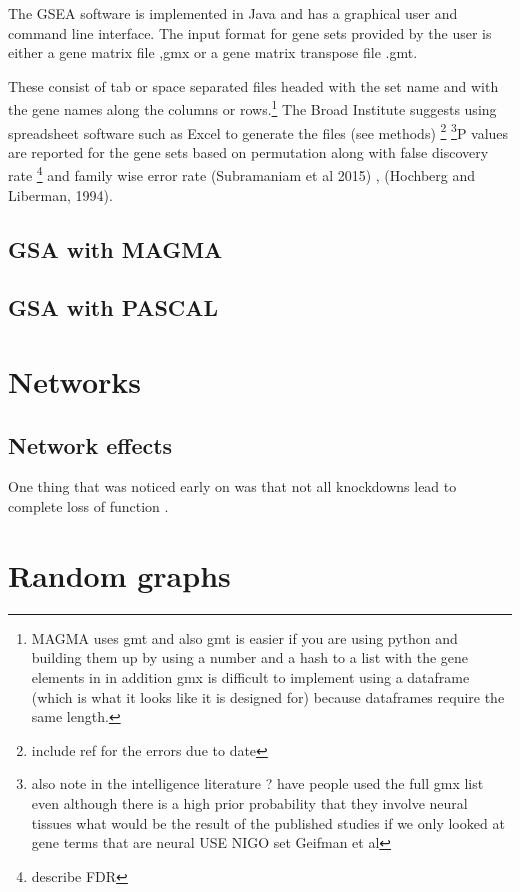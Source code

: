 The GSEA software is implemented in Java and has a graphical user and command line interface. The input format for gene sets provided by the user is either a gene matrix file ,gmx or a gene matrix transpose file .gmt.

These consist of tab or space separated files headed with the set name and with the gene names along the columns or rows.\footnote{MAGMA uses gmt and also gmt is easier if you are using python and building them up by using a number and a hash to a list with the gene elements in in addition gmx is difficult to implement using a dataframe (which is what it looks like it is designed for) because dataframes require the same length.} The Broad Institute suggests using spreadsheet software such as Excel to generate the files (see methods) \footnote{include ref for the errors due to date} \footnote{also note in the intelligence literature ? have people used the full gmx list even although there is a high prior probability that they involve neural tissues what would be the result of the published studies if we only looked at gene terms that are neural USE NIGO set   Geifman et al}P values are reported for the gene sets based on permutation along with false discovery rate \cite{benjamini1995controlling}\footnote{describe FDR} and family wise error rate (Subramaniam et al 2015) , (Hochberg and Liberman, 1994).

\subsection{GSA with MAGMA}

\subsection{GSA with PASCAL}
\cite{lamparter2016fast}
\section{Networks}
\label{sec:networks_intro}
\subsection{Network effects}
One thing that was noticed early on was that not all knockdowns lead to complete loss of function \cite{keverne1997evaluation}. \cite{charlesworth2016canalization}
\section{Random graphs}
\label{sec: intro_random_graphs}
